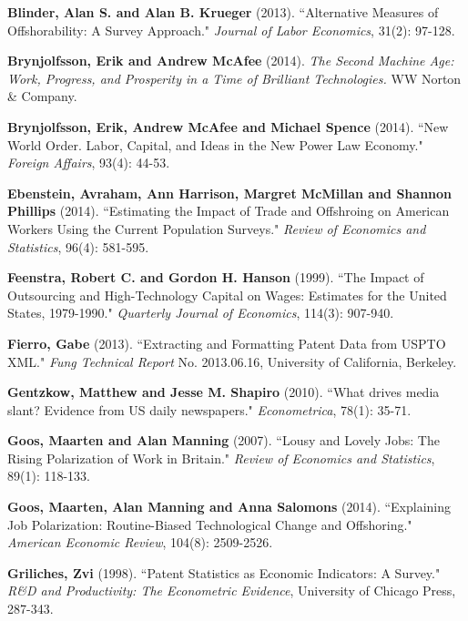 \documentclass[11pt,a4paper]{article}
\begin{document}
\begin{thebibliography}{9}
	 \textbf{Blinder, Alan S. and Alan B. Krueger} (2013). ``Alternative Measures of Offshorability: A Survey Approach." \textit{Journal of Labor Economics}, 31(2): 97-128.
	
	 \textbf{Brynjolfsson, Erik and Andrew McAfee} (2014). \textit{The Second Machine Age: Work, Progress, and Prosperity in a Time of Brilliant Technologies.} WW Norton \& Company.
	
		\textbf{Brynjolfsson, Erik, Andrew McAfee and Michael Spence} (2014). ``New World Order. Labor, Capital, and Ideas in the New Power Law Economy." \textit{Foreign Affairs}, 93(4): 44-53.
	
	 \textbf{Ebenstein, Avraham, Ann Harrison, Margret McMillan and Shannon Phillips} (2014). ``Estimating the Impact of Trade and Offshroing on American Workers Using the Current Population Surveys." \textit{Review of Economics and Statistics}, 96(4): 581-595. 
	
	 \textbf{Feenstra, Robert C. and Gordon H. Hanson} (1999). ``The Impact of Outsourcing and High-Technology Capital on Wages: Estimates for the United States, 1979-1990." \textit{Quarterly Journal of Economics}, 114(3): 907-940.

	 \textbf{Fierro, Gabe} (2013). ``Extracting and Formatting Patent Data from USPTO XML." \textit{Fung Technical Report} No. 2013.06.16, University of California, Berkeley.
	
	 \textbf{Gentzkow, Matthew and Jesse M. Shapiro} (2010). ``What drives media slant? Evidence from US daily newspapers." \textit{Econometrica}, 78(1): 35-71.

	 \textbf{Goos, Maarten and Alan Manning} (2007). ``Lousy and Lovely Jobs: The Rising Polarization of Work in Britain." \textit{Review of Economics and Statistics}, 89(1): 118-133.
	
	 \textbf{Goos, Maarten, Alan Manning and Anna Salomons} (2014). ``Explaining Job Polarization: Routine-Biased Technological Change and Offshoring." \textit{American Economic Review}, 104(8): 2509-2526.
	
	 \textbf{Griliches, Zvi} (1998). ``Patent Statistics as Economic Indicators: A Survey." \textit{R&D and Productivity: The Econometric Evidence}, University of Chicago Press, 287-343.
	

\end{thebibliography}
\end{document}
